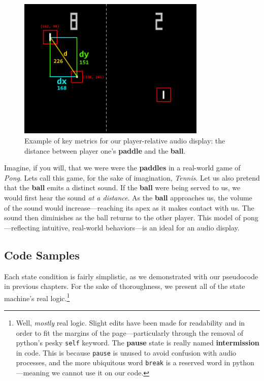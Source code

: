 \documentclass{report}
\newcommand{\state}[1]{\textbf{#1}}
\newcommand{\pad}{\textbf{paddle}\xspace}
\newcommand{\ball}{\textbf{ball}\xspace}
\begin{document}
\begin{figure}[ht]
    \centering
    \includegraphics[width=0.8\textwidth]{distCalc.png}
    \caption{Example of key metrics for our player-relative audio display: the distance between player one's \pad and the \ball.}
    \label{fig:distCalc}
\end{figure}

Imagine, if you will, that we were were the \state{paddles} in a real-world game of \emph{Pong}. Lets call this game, for the sake of imagination, \emph{Tennis}. Let us also pretend that the \ball emits a distinct sound. If the \ball were being served to us, we would first hear the sound \emph{at a distance}. As the \ball approaches us, the volume of the sound would increase---reaching its apex as it makes contact with us. The sound then diminishes as the ball returns to the other player. This model of pong---reflecting intuitive, real-world behaviors---is an ideal for an audio display.


\subsection{Code Samples}
Each state condition is fairly simplistic, as we demonstrated with our pseudocode in previous chapters. For the sake of thoroughness, we present all of the state machine's real logic.\footnote{Well, \emph{mostly} real logic. Slight edits have been made for readability and in order to fit the margins of the page---particularly through the removal of python's pesky \texttt{self} keyword. The \state{pause} state is really named \state{intermission} in code. This is because \texttt{pause} is unused to avoid confusion with audio processes, and the more ubiquitous word \texttt{break} is a reserved word in python---meaning we cannot use it on our code.}
\end{document}
